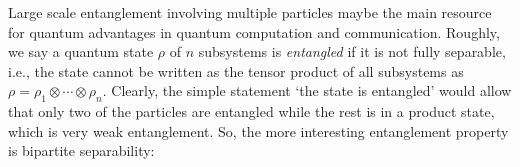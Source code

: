 \documentclass[
aps,
pra,
twocolumn,
floatfix,
]{revtex4-2}
\theoremstyle{plain}
\theoremstyle{definition}
\newtheorem{definition}{Definition}
\newcommand{\dm}{\rho}
\newcommand{\separableset}{\mathcal{S}}
\newcommand{\ppartition}{\mathcal{P}}
\begin{document}
Large scale entanglement involving multiple particles maybe the main resource for quantum advantages in quantum computation and communication.
Roughly, we say a quantum state $\dm$ of $n$ subsystems is \emph{entangled} if it is not fully separable,
i.e., the state cannot be written as the tensor product of all subsystems as $\dm=\rho_1\otimes\cdots\otimes\rho_n$.
Clearly, the simple statement `the state is entangled' would allow that only two of the particles are entangled while the rest is in a product state, which is very weak entanglement.
So, the more interesting entanglement property is bipartite separability:
\end{document}
